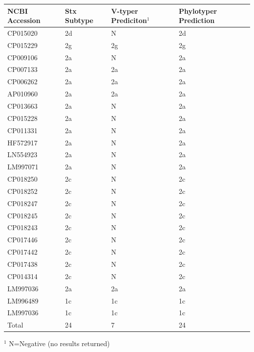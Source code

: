 \documentclass[11pt,letterpaper]{article}
\begin{document}
\begin{minipage}{\linewidth}
\centering
{}
\medskip
\begin{tabular}{@{}llll@{}}\toprule
NCBI Accession & Stx Subtype & V-typer Prediciton$^{1}$ & Phylotyper Prediction\\\midrule
CP015020 & 2d & N & 2d \\
CP015229 & 2g & 2g & 2g \\
CP009106 & 2a & N & 2a \\
CP007133 & 2a & 2a & 2a \\
CP006262 & 2a & 2a & 2a \\
AP010960 & 2a & 2a & 2a \\
CP013663 & 2a & N & 2a \\
CP015228 & 2a & N & 2a \\
CP011331 & 2a & N & 2a \\
HF572917 & 2a & N & 2a \\
LN554923 & 2a & N & 2a \\
LM997071 & 2a & N & 2a \\
CP018250 & 2c & N & 2c \\
CP018252 & 2c & N & 2c \\
CP018247 & 2c & N & 2c \\
CP018245 & 2c & N & 2c \\
CP018243 & 2c & N & 2c \\
CP017446 & 2c & N & 2c \\
CP017442 & 2c & N & 2c \\
CP017438 & 2c & N & 2c \\
CP014314 & 2c & N & 2c \\
LM997036 & 2a & 2a & 2a \\
LM996489 & 1c & 1c & 1c \\
LM997036 & 1c & 1c & 1c \\
Total & 24 & 7 & 24 \\
\bottomrule
\end{tabular}\par
\bigskip
\raggedright
$^{1}$ N=Negative (no results returned)

\end{minipage}
\end{document}
